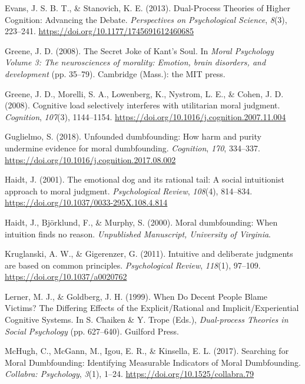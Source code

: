 \documentclass[
  american,
  man,floatsintext]{apa7}
\begin{document}
\leavevmode\hypertarget{ref-evans_dualprocess_2013}{}%
Evans, J. S. B. T., \& Stanovich, K. E. (2013). Dual-Process Theories of Higher Cognition: Advancing the Debate. \emph{Perspectives on Psychological Science}, \emph{8}(3), 223--241. \url{https://doi.org/10.1177/1745691612460685}

\leavevmode\hypertarget{ref-greene_secret_2008}{}%
Greene, J. D. (2008). The Secret Joke of Kant's Soul. In \emph{Moral Psychology Volume 3: The neurosciences of morality: Emotion, brain disorders, and development} (pp. 35--79). Cambridge (Mass.): the MIT press.

\leavevmode\hypertarget{ref-greene_cognitive_2008}{}%
Greene, J. D., Morelli, S. A., Lowenberg, K., Nystrom, L. E., \& Cohen, J. D. (2008). Cognitive load selectively interferes with utilitarian moral judgment. \emph{Cognition}, \emph{107}(3), 1144--1154. \url{https://doi.org/10.1016/j.cognition.2007.11.004}

\leavevmode\hypertarget{ref-guglielmo_unfounded_2018}{}%
Guglielmo, S. (2018). Unfounded dumbfounding: How harm and purity undermine evidence for moral dumbfounding. \emph{Cognition}, \emph{170}, 334--337. \url{https://doi.org/10.1016/j.cognition.2017.08.002}

\leavevmode\hypertarget{ref-haidt_emotional_2001}{}%
Haidt, J. (2001). The emotional dog and its rational tail: A social intuitionist approach to moral judgment. \emph{Psychological Review}, \emph{108}(4), 814--834. \url{https://doi.org/10.1037/0033-295X.108.4.814}

\leavevmode\hypertarget{ref-haidt_moral_2000}{}%
Haidt, J., Björklund, F., \& Murphy, S. (2000). Moral dumbfounding: When intuition finds no reason. \emph{Unpublished Manuscript, University of Virginia}.

\leavevmode\hypertarget{ref-kruglanski_intuitive_2011}{}%
Kruglanski, A. W., \& Gigerenzer, G. (2011). Intuitive and deliberate judgments are based on common principles. \emph{Psychological Review}, \emph{118}(1), 97--109. \url{https://doi.org/10.1037/a0020762}

\leavevmode\hypertarget{ref-lerner_when_1999}{}%
Lerner, M. J., \& Goldberg, J. H. (1999). When Do Decent People Blame Victims? The Differing Effects of the Explicit/Rational and Implicit/Experiential Cognitive Systems. In S. Chaiken \& Y. Trope (Eds.), \emph{Dual-process Theories in Social Psychology} (pp. 627--640). Guilford Press.

\leavevmode\hypertarget{ref-mchugh_searching_2017a}{}%
McHugh, C., McGann, M., Igou, E. R., \& Kinsella, E. L. (2017). Searching for Moral Dumbfounding: Identifying Measurable Indicators of Moral Dumbfounding. \emph{Collabra: Psychology}, \emph{3}(1), 1--24. \url{https://doi.org/10.1525/collabra.79}
\end{document}
